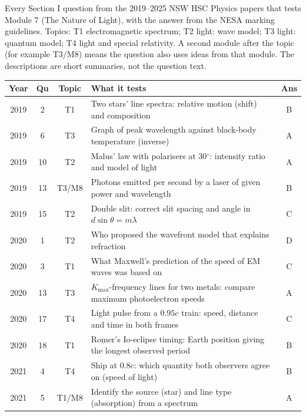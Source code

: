 \documentclass[12pt]{article}
\begin{document}
Every Section I question from the 2019--2025 NSW HSC Physics papers that tests Module 7
(The Nature of Light), with the answer from the NESA marking guidelines. Topics: T1 electromagnetic spectrum; T2 light: wave model; T3 light: quantum model; T4 light and special relativity. A second module after
the topic (for example T3/M8) means the question also uses ideas from that module. The descriptions are
short summaries, not the question text.

{\small\renewcommand{}
\begin{longtable}{|c|c|c|p{108mm}|c|}
  \hline
  \textbf{Year} & \textbf{Qu} & \textbf{Topic} & \textbf{What it tests} & \textbf{Ans}\\ \hline
  \endhead
    2019 & 2 & T1 & Two stars' line spectra: relative motion (shift) and composition & B\\ \hline
    2019 & 6 & T3 & Graph of peak wavelength against black-body temperature (inverse) & A\\ \hline
    2019 & 10 & T2 & Malus' law with polarisers at 30$^\circ$: intensity ratio and model of light & A\\ \hline
    2019 & 13 & T3/\allowbreak M8 & Photons emitted per second by a laser of given power and wavelength & B\\ \hline
    2019 & 15 & T2 & Double slit: correct slit spacing and angle in $d\sin\theta = m\lambda$ & C\\ \hline
    2020 & 1 & T2 & Who proposed the wavefront model that explains refraction & D\\ \hline
    2020 & 3 & T1 & What Maxwell's prediction of the speed of EM waves was based on & C\\ \hline
    2020 & 13 & T3 & $K_\mathrm{max}$-frequency lines for two metals: compare maximum photoelectron speeds & A\\ \hline
    2020 & 17 & T4 & Light pulse from a $0.95c$ train: speed, distance and time in both frames & C\\ \hline
    2020 & 18 & T1 & Romer's Io-eclipse timing: Earth position giving the longest observed period & B\\ \hline
    2021 & 4 & T4 & Ship at $0.8c$: which quantity both observers agree on (speed of light) & B\\ \hline
    2021 & 5 & T1/\allowbreak M8 & Identify the source (star) and line type (absorption) from a spectrum & A\\ \hline

\end{longtable}}
\end{document}
